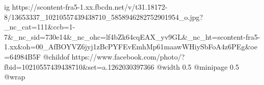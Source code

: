  
 
 
 
 

\ifcmt
  ig https://scontent-fra5-1.xx.fbcdn.net/v/t31.18172-8/13653337_10210557439438710_5858946282752901954_o.jpg?_nc_cat=111&ccb=1-7&_nc_sid=730e14&_nc_ohc=lf4bZk64cqEAX_yv9GL&_nc_ht=scontent-fra5-1.xx&oh=00_AfBOYVZ6jyj1zBcPYFEvEmhMp61maawWHiySbFoA4z6PEg&oe=64984B5F
	@childof https://www.facebook.com/photo/?fbid=10210557439438710&set=a.1262030397366
  @width 0.5
  @minipage 0.5
  @wrap \parpic[r]
\fi
